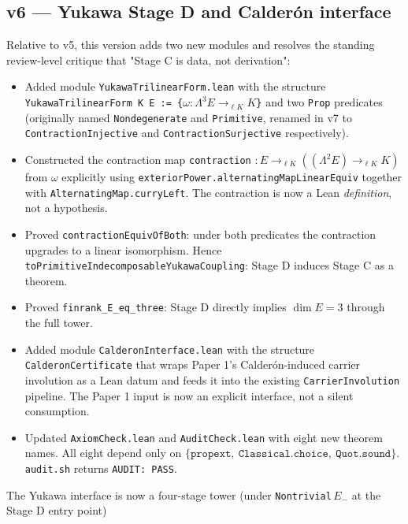 \subsection*{v6 --- Yukawa Stage D and Calderón interface}

Relative to v5, this version adds two new modules and resolves
the standing review-level critique that "Stage C is data, not
derivation":

\begin{itemize}[leftmargin=1.6em, itemsep=2pt]
\item Added module \texttt{YukawaTrilinearForm.lean} with the
    structure
    \texttt{YukawaTrilinearForm K E := \{$\omega : \Lambda^3 E \to_{\ell K} K$\}}
    and two \texttt{Prop} predicates (originally named
    \texttt{Nondegenerate} and \texttt{Primitive}, renamed in
    v7 to \texttt{ContractionInjective} and
    \texttt{ContractionSurjective} respectively).
\item Constructed the contraction map
    \texttt{contraction} $: E \to_{\ell K} ((\Lambda^2 E) \to_{\ell K} K)$ from $\omega$
    explicitly using
    \texttt{exteriorPower.alternatingMapLinearEquiv} together
    with \texttt{AlternatingMap.curryLeft}. The contraction is
    now a Lean \emph{definition}, not a hypothesis.
\item Proved
    \texttt{contractionEquivOfBoth}: under both predicates the
    contraction upgrades to a linear isomorphism. Hence
    \texttt{toPrimitiveIndecomposableYukawaCoupling}: Stage D
    induces Stage C as a theorem.
\item Proved
    \texttt{finrank\_E\_eq\_three}: Stage D directly implies
    $\dim E = 3$ through the full tower.
\item Added module \texttt{CalderonInterface.lean} with the
    structure \texttt{CalderonCertificate} that wraps Paper 1's
    Calder\'on-induced carrier involution as a Lean datum and
    feeds it into the existing \texttt{CarrierInvolution}
    pipeline. The Paper 1 input is now an explicit
    interface, not a silent consumption.
\item Updated \texttt{AxiomCheck.lean} and
    \texttt{AuditCheck.lean} with eight new theorem names.
    All eight depend only on
    $\{\texttt{propext},\ \texttt{Classical.choice},\
    \texttt{Quot.sound}\}$. \texttt{audit.sh} returns
    \texttt{AUDIT:\ PASS}.
\end{itemize}

\smallskip
The Yukawa interface is now a four-stage tower (under
\texttt{Nontrivial}\,$E_-$ at the Stage D entry point)

